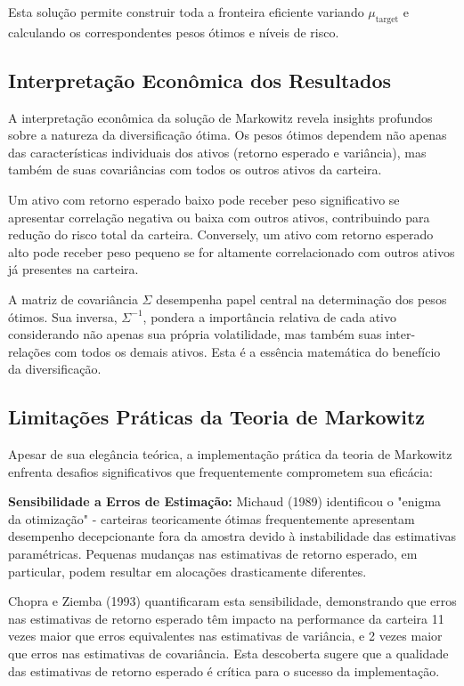 Esta solução permite construir toda a fronteira eficiente variando $\mu_{\text{target}}$ e calculando os correspondentes pesos ótimos e níveis de risco.

\subsection{Interpretação Econômica dos Resultados}

A interpretação econômica da solução de Markowitz revela insights profundos sobre a natureza da diversificação ótima. Os pesos ótimos dependem não apenas das características individuais dos ativos (retorno esperado e variância), mas também de suas covariâncias com todos os outros ativos da carteira.

Um ativo com retorno esperado baixo pode receber peso significativo se apresentar correlação negativa ou baixa com outros ativos, contribuindo para redução do risco total da carteira. Conversely, um ativo com retorno esperado alto pode receber peso pequeno se for altamente correlacionado com outros ativos já presentes na carteira.

A matriz de covariância $\Sigma$ desempenha papel central na determinação dos pesos ótimos. Sua inversa, $\Sigma^{-1}$, pondera a importância relativa de cada ativo considerando não apenas sua própria volatilidade, mas também suas inter-relações com todos os demais ativos. Esta é a essência matemática do benefício da diversificação.

\subsection{Limitações Práticas da Teoria de Markowitz}

Apesar de sua elegância teórica, a implementação prática da teoria de Markowitz enfrenta desafios significativos que frequentemente comprometem sua eficácia:

\textbf{Sensibilidade a Erros de Estimação:} Michaud (1989) identificou o "enigma da otimização" - carteiras teoricamente ótimas frequentemente apresentam desempenho decepcionante fora da amostra devido à instabilidade das estimativas paramétricas. Pequenas mudanças nas estimativas de retorno esperado, em particular, podem resultar em alocações drasticamente diferentes.

Chopra e Ziemba (1993) quantificaram esta sensibilidade, demonstrando que erros nas estimativas de retorno esperado têm impacto na performance da carteira 11 vezes maior que erros equivalentes nas estimativas de variância, e 2 vezes maior que erros nas estimativas de covariância. Esta descoberta sugere que a qualidade das estimativas de retorno esperado é crítica para o sucesso da implementação.

